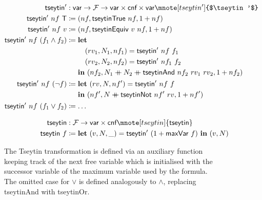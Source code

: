 \begin{figure}
\begin{align*}
  \tseytin' &: \var \rightarrow \formula \rightarrow \var \times \cnf \times \var \mnote[tseytin']{$\tseytin'$}\\
  \tseytin'~nf~\btrue &\defeq (nf, \textsf{tseytinTrue}~nf, \natS{nf}) \\
  \tseytin'~nf~v &\defeq (nf, \textsf{tseytinEquiv}~v~nf, \natS{nf}) \\
  \tseytin'~nf~(f_1 \land f_2) &\defeq \begin{aligned}[t] 
    &\llet \\
    & \quad (rv_1, N_1, nf_1) = \tseytin'~nf~f_1 \\
    & \quad (rv_2, N_2, nf_2) = \tseytin'~nf_1~f_2 \\
    & \lin (nf_2, N_1 \concat N_2 \concat \textsf{tseytinAnd}~nf_2~rv_1~rv_2, \natS{nf_2})
  \end{aligned}\\
    \tseytin'~nf~(\lnot f) &\defeq \begin{aligned}[t]
      &\llet (rv, N, nf') = \tseytin'~nf~f \\
      &\lin (nf', N \concat \textsf{tseytinNot}~nf'~rv, \natS{nf}')
    \end{aligned} \\
  \tseytin'~nf~(f_1 \lor f_2) &\defeq \ldots \\[0.8em]
  \tseytin & : \formula \rightarrow \var \times \cnf \mnote[tseytin]{\tseytin}\\
  \tseytin~f &\defeq \llet (v, N, \_) = \tseytin'~(\natS{\textsf{maxVar}~f})~\lin (v, N) 
\end{align*}
\caption{The Tseytin transformation is defined via an auxiliary function keeping track of the next free variable which is initialised with the successor variable of the maximum variable used by the formula. The omitted case for $\lor$ is defined analogously to $\land$, replacing \textsf{tseytinAnd} with \textsf{tseytinOr}.}\label{lst:tseytin}
\end{figure}

